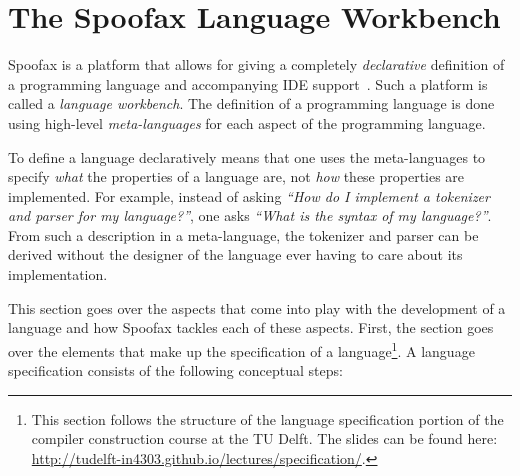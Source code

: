\section{The Spoofax Language Workbench}
\label{sec:a-spoofax}

Spoofax is a platform that allows for giving a completely
\emph{declarative} definition of a programming language and accompanying
IDE support~\cite{Kats10a}. Such a platform is called a \emph{language
workbench}. The definition of a programming language is done using
high-level \emph{meta-languages} for each aspect of the programming
language.

To define a language declaratively means that one uses the
meta-languages to specify \emph{what} the properties of a language are, not
\emph{how} these properties are implemented. For example, instead of asking
\emph{​``How do I implement a tokenizer and parser for my language?''​}, one
asks \emph{​``What is the syntax of my language?''​}. From such a description
in a meta-language, the tokenizer and parser can be derived without
the designer of the language ever having to care about its
implementation.

This section goes over the aspects that come into play with the
development of a language and how Spoofax tackles each of these
aspects. First, the section goes over the elements that make up the
specification of a language\footnote{This section follows
the structure of the language specification portion of the compiler
construction course at the TU Delft. The slides can be found here:
\url{http://tudelft-in4303.github.io/lectures/specification/}.}. A language
specification consists of the following conceptual steps:

